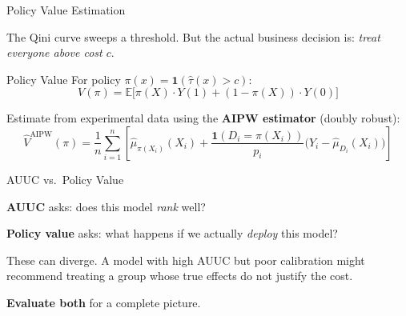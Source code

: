 \documentclass[aspectratio=169, 11pt]{beamer}
\newcommand{\E}{\mathbb{E}}
\begin{document}
\begin{frame}{Policy Value Estimation}
 
The Qini curve sweeps a threshold. But the actual business decision is: \emph{treat everyone above cost $c$}.
 
\begin{block}{Policy Value}
For policy $\pi(x) = \mathbf{1}(\hat{\tau}(x) > c)$:
\[
V(\pi) = \E\bigl[\pi(X) \cdot Y(1) + (1 - \pi(X)) \cdot Y(0)\bigr]
\]
\end{block}
 
\bigskip
 
Estimate from experimental data using the \textbf{AIPW estimator} (doubly robust):
\[
\hat{V}^{\text{AIPW}}(\pi) = \frac{1}{n}\sum_{i=1}^{n}\left[\hat{\mu}_{\pi(X_i)}(X_i) + \frac{\mathbf{1}(D_i = \pi(X_i))}{p_i}\bigl(Y_i - \hat{\mu}_{D_i}(X_i)\bigr)\right]
\]
\end{frame}
 
\begin{frame}{AUUC vs.\ Policy Value}
 
\textbf{AUUC} asks: does this model \emph{rank} well?
 
\bigskip
 
\textbf{Policy value} asks: what happens if we actually \emph{deploy} this model?
 
\bigskip
 
These can diverge. A model with high AUUC but poor calibration might recommend treating a group whose true effects do not justify the cost.
 
\bigskip
 
\textbf{Evaluate both} for a complete picture.
\end{frame}
 
\end{document}
